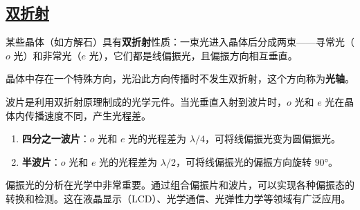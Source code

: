 \subsection{\protect\hyperlink{:}{双折射}}

\begin{definition}[双折射]
    某些晶体（如方解石）具有\textbf{双折射}性质：一束光进入晶体后分成两束——寻常光（$o$ 光）和非常光（$e$ 光），它们都是线偏振光，且偏振方向相互垂直。
\end{definition}

\begin{definition}[光轴]
    晶体中存在一个特殊方向，光沿此方向传播时不发生双折射，这个方向称为\textbf{光轴}。
\end{definition}

\begin{definition}[波片]
    波片是利用双折射原理制成的光学元件。当光垂直入射到波片时，$o$ 光和 $e$ 光在晶体内传播速度不同，产生光程差。
    \begin{enumerate}
        \item \textbf{四分之一波片}：$o$ 光和 $e$ 光的光程差为 $\lambda/4$，可将线偏振光变为圆偏振光。
        \item \textbf{半波片}：$o$ 光和 $e$ 光的光程差为 $\lambda/2$，可将线偏振光的偏振方向旋转 $90°$。
    \end{enumerate}
\end{definition}

\begin{remark}
    偏振光的分析在光学中非常重要。通过组合偏振片和波片，可以实现各种偏振态的转换和检测。这在液晶显示（LCD）、光学通信、光弹性力学等领域有广泛应用。
\end{remark}
